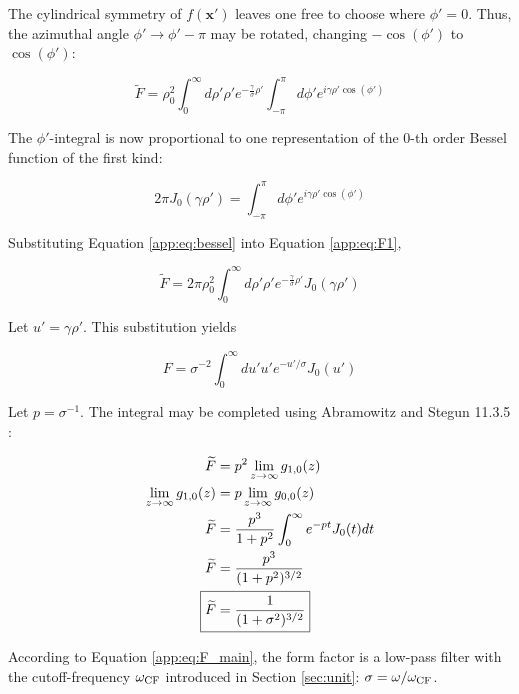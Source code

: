 \documentclass[amsmath,amssymb,aps,prd,10pt,twocolumn]{revtex4}
\begin{document}
The cylindrical symmetry of $f(\mathbf{x}')$ leaves one free to choose where $\phi' = 0$.  Thus, the azimuthal angle $\phi' \rightarrow \phi' - \pi$ may be rotated, changing $-\cos(\phi')$ to $\cos(\phi')$:

\begin{equation}
\widetilde{F} = \rho_0^2 \int_0^{\infty} d\rho' \rho' e^{-\frac{\gamma}{\sigma}\rho'} \int_{-\pi}^{\pi} d\phi' e^{i\gamma \rho' \cos(\phi')} \label{app:eq:F1}
\end{equation}

The $\phi'$-integral is now proportional to one representation of the 0-th order Bessel function of the first kind:

\begin{equation}
2\pi J_0 (\gamma \rho') = \int_{-\pi}^{\pi} d\phi' e^{i\gamma \rho' \cos(\phi')} \label{app:eq:bessel}
\end{equation}

Substituting Equation \ref{app:eq:bessel} into Equation \ref{app:eq:F1},

\begin{equation}
\widetilde{F} = 2\pi \rho_0^2 \int_0^{\infty} d\rho' \rho' e^{-\frac{\gamma}{\sigma}\rho'} J_0(\gamma \rho')
\end{equation}

Let $u' = \gamma \rho'$.  This substitution yields

\begin{equation}
F = \sigma^{-2} \int_0^{\infty} du' u' e^{-u'/\sigma} J_0(u')
\end{equation}

Let $p = \sigma^{-1}$.  The integral may be completed using Abramowitz and Stegun 11.3.5 \cite{AS}:

\begin{align}
\widetilde{F} &= p^2 \lim_{z \to \infty} g_{1,0} (z) \\
\lim_{z \to \infty} g_{1,0} (z) &= p \lim_{z \to \infty} g_{0,0} (z) \\
\widetilde{F} &= \frac{p^3}{1+p^2} \int_0^{\infty} e^{-pt} J_0(t) dt \\
\widetilde{F} &= \frac{p^3}{(1+p^2)^{3/2}} \\
\Aboxed{\widetilde{F} &= \frac{1}{(1+\sigma^2)^{3/2}}} \label{app:eq:F_main}
\end{align}

According to Equation \ref{app:eq:F_main}, the form factor is a low-pass filter with the cutoff-frequency $\omega_{\rm CF}$ introduced in Section \ref{sec:unit}: $\sigma = \omega/\omega_{\rm CF}$.
\end{document}
